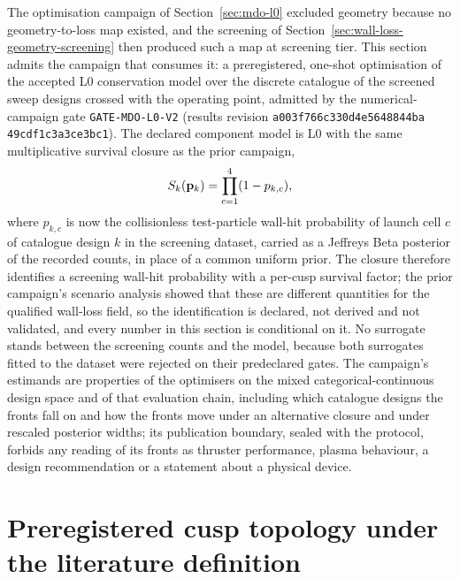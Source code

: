 \documentclass[11pt]{article}
\newcommand{\MdbEvidenceRevision}{\texttt{a003f766\allowbreak{}c330d4e5\allowbreak{}648844ba\allowbreak{}%
49cdf1c3\allowbreak{}a3ce3bc1}}
\begin{document}
The optimisation campaign of Section~\ref{sec:mdo-l0} excluded geometry because no
geometry-to-loss map existed, and the screening of
Section~\ref{sec:wall-loss-geometry-screening} then produced such a map at
screening tier. This section admits the campaign that consumes it: a
preregistered, one-shot optimisation of the accepted L0 conservation model over
the discrete catalogue of the \MdbCatalogueSize{} screened sweep designs crossed
with the operating point, admitted by the numerical-campaign gate
\texttt{GATE-MDO-L0-V2} (results revision \MdbEvidenceRevision). The declared
component model is L0 with the same multiplicative survival closure as the prior
campaign,
\begin{equation}
  S_k(\mathbf p_k)=\prod_{c=1}^{4}(1-p_{k,c}),
\end{equation}
where $p_{k,c}$ is now the collisionless test-particle wall-hit probability of
launch cell $c$ of catalogue design $k$ in the screening dataset, carried as a
Jeffreys Beta posterior of the recorded counts, in place of a common uniform
prior. The closure therefore identifies a screening wall-hit probability with a
per-cusp survival factor; the prior campaign's scenario analysis showed that
these are different quantities for the qualified wall-loss field, so the
identification is declared, not derived and not validated, and every number in
this section is conditional on it. No surrogate stands between the screening
counts and the model, because both surrogates fitted to the dataset were
rejected on their predeclared gates. The campaign's estimands are properties of
the optimisers on the mixed categorical-continuous design space and of that
evaluation chain, including which catalogue designs the fronts fall on and how
the fronts move under an alternative closure and under rescaled posterior
widths; its publication boundary, sealed with the protocol, forbids any reading
of its fronts as thruster performance, plasma behaviour, a design recommendation
or a statement about a physical device.



\section{Preregistered cusp topology under the literature definition}
\label{sec:cusp-topology}
\end{document}
